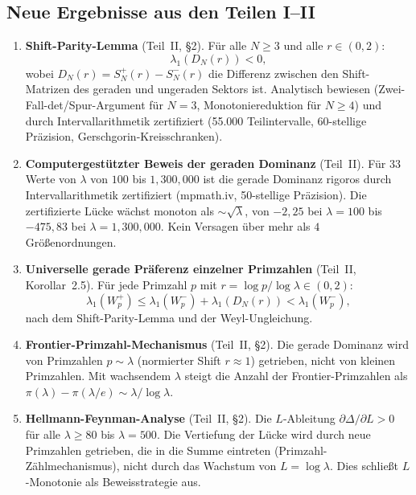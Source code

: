 \documentclass[12pt,a4paper]{article}
\theoremstyle{definition}
\theoremstyle{remark}
\begin{document}
\subsection{Neue Ergebnisse aus den Teilen I--II}

\begin{enumerate}[label=\textbf{N\arabic*},leftmargin=3em]
  \item \textbf{Shift-Parity-Lemma} (Teil~II, \S2). Für alle $N \geq 3$ und alle $r \in (0,2)$:
  \[ \lambda_1(D_N(r)) < 0, \]
  wobei $D_N(r) = S_N^+(r) - S_N^-(r)$ die Differenz zwischen den Shift-Matrizen des geraden und ungeraden Sektors ist. Analytisch bewiesen (Zwei-Fall-det/Spur-Argument für $N=3$, Monotoniereduktion für $N \geq 4$) und durch Intervallarithmetik zertifiziert (55.000 Teilintervalle, 60-stellige Präzision, Gerschgorin-Kreisschranken).

  \item \textbf{Computergestützter Beweis der geraden Dominanz} (Teil~II). Für $33$ Werte von $\lambda$ von $100$ bis $1{,}300{,}000$ ist die gerade Dominanz rigoros durch Intervallarithmetik zertifiziert (mpmath.iv, 50-stellige Präzision). Die zertifizierte Lücke wächst monoton als $\sim\!\sqrt{\lambda}$, von $-2{,}25$ bei $\lambda = 100$ bis $-475{,}83$ bei $\lambda = 1{,}300{,}000$. Kein Versagen über mehr als $4$ Größenordnungen.

  \item \textbf{Universelle gerade Präferenz einzelner Primzahlen} (Teil~II, Korollar~2.5). Für jede Primzahl $p$ mit $r = \log p / \log\lambda \in (0,2)$:
  \[ \lambda_1(W_p^+) \leq \lambda_1(W_p^-) + \lambda_1(D_N(r)) < \lambda_1(W_p^-), \]
  nach dem Shift-Parity-Lemma und der Weyl-Ungleichung.

  \item \textbf{Frontier-Primzahl-Mechanismus} (Teil~II, \S2). Die gerade Dominanz wird von Primzahlen $p \sim \lambda$ (normierter Shift $r \approx 1$) getrieben, nicht von kleinen Primzahlen. Mit wachsendem $\lambda$ steigt die Anzahl der Frontier-Primzahlen als $\pi(\lambda) - \pi(\lambda/e) \sim \lambda/\log\lambda$.

  \item \textbf{Hellmann-Feynman-Analyse} (Teil~II, \S2). Die $L$-Ableitung $\partial\Delta/\partial L > 0$ für alle $\lambda \geq 80$ bis $\lambda = 500$. Die Vertiefung der Lücke wird durch neue Primzahlen getrieben, die in die Summe eintreten (Primzahl-Zählmechanismus), nicht durch das Wachstum von $L = \log\lambda$. Dies schließt $L$-Monotonie als Beweisstrategie aus.


\end{enumerate}
\end{document}
